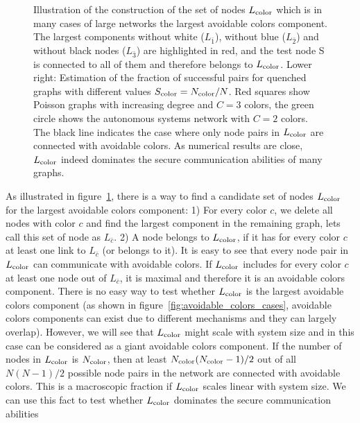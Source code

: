 \documentclass[aps, pre, twocolumn, a4paper, floatfix]{revtex4}
\begin{document}
\begin{figure}[htb]
\begin{center}
    \caption{Illustration of the construction of the  set of nodes $L_{\rm color}$ which is in 
    many cases of large networks the largest avoidable colors component. The 
    largest components without white ($L_{\bar 1}$), without blue ($L_{\bar 2}$) and without 
    black nodes ($L_{\bar 3}$) are highlighted in red, and the test node S is connected to 
    all of them and therefore belongs to $L_{\rm color}$. Lower right: Estimation of the fraction 
    of successful pairs for quenched graphs with different values $S_{\rm color}=N_{\rm color}/N$. 
    Red squares show Poisson graphs with increasing degree and $C=3$ colors, the green circle 
    shows the autonomous systems network with $C=2$ colors. The black line indicates the case 
    where only node pairs in $L_{\rm color}$ are connected with avoidable colors. As numerical 
    results are close, $L_{\rm color}$ indeed dominates the secure communication abilities of many
    graphs.}
    \label{fig:avoidable_colors_candidate}
\end{center}
\end{figure}
%
As illustrated in figure~\ref{fig:avoidable_colors_candidate}, there is a way to find a 
candidate set of nodes $L_{\rm color}$ 
for the largest avoidable colors component: 1) For every color $c$, we delete all nodes 
with color $c$ and find the largest component in the remaining graph, lets call 
this set of node as $L_{\bar c}$. 2) A node belongs to $L_{\rm color}$, if it has 
for every color $c$ at least one link to $L_{\bar c}$ (or belongs to it). It is easy to 
see that every node pair in $L_{\rm color}$ can communicate with avoidable colors. 
If $L_{\rm color}$ includes for every color $c$ at least one node out of $L_{\bar c}$, 
it is maximal and therefore it is an avoidable colors component. There is no easy way to 
test whether $L_{\rm color}$ is the largest avoidable colors component (as shown in 
figure~\ref{fig:avoidable_colors_cases}, avoidable colors components can exist due to 
different mechanisms and they can largely overlap). However, we will see that 
$L_{\rm color}$ might scale with system size and in this case can be considered as a 
giant avoidable colors component. If the number of nodes in $L_{\rm color}$ is 
$N_{\rm color}$, then at least $N_{\rm color}(N_{\rm color}-1)/2$ out of all $N(N-1)/2$ 
possible node pairs in the network are connected with avoidable colors. This is a 
macroscopic fraction if $L_{\rm color}$ scales linear with system size. We can use 
this fact to test whether $L_{\rm color}$ dominates the secure communication abilities 
\end{document}
